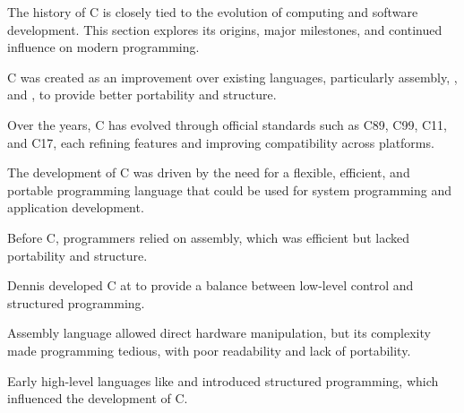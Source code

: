 \begin{NxSBox}[][History of C]
    \begin{NxIDBox}
        The history of C is closely tied to the evolution of computing and software development. This section explores its origins, major milestones, and continued influence on modern programming.
    \end{NxIDBox}
    \begin{NxIDBoxL}
         C was created as an improvement over existing languages, particularly assembly, , and , to provide better portability and structure.
    \end{NxIDBoxL}
    \begin{NxIDBoxL}
         Over the years, C has evolved through official standards such as C89, C99, C11, and C17, each refining features and improving compatibility across platforms.
    \end{NxIDBoxL}
\end{NxSBox}

\begin{NxSSBox}
    \begin{NxIDBox}
        The development of C was driven by the need for a flexible, efficient, and portable programming language that could be used for system programming and application development.
    \end{NxIDBox}
    \begin{NxIDBoxL}
         Before C, programmers relied on assembly, which was efficient but lacked portability and structure.
    \end{NxIDBoxL}
    \begin{NxIDBoxL}
         Dennis  developed C at  to provide a balance between low-level control and structured programming.
    \end{NxIDBoxL}
\end{NxSSBox}

\begin{NxSSSBox}
    \begin{NxIDBox}[title={Limitations of Assembly}]
        Assembly language allowed direct hardware manipulation, but its complexity made programming tedious, with poor readability and lack of portability.
    \end{NxIDBox}
    \begin{NxIDBox}[title={Influence of ALGOL and BCPL}]
        Early high-level languages like  and  introduced structured programming, which influenced the development of C.
    \end{NxIDBox}
\end{NxSSSBox}

